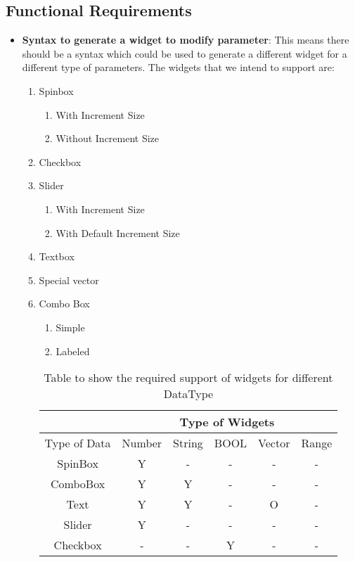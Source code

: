 \subsection{Functional Requirements}
\begin{itemize}
    \item {\bf Syntax to generate a widget to modify parameter}: This means there should be a syntax which could be used to generate a different widget for a different type of parameters.
    The widgets that we intend to support are:
    \begin{enumerate}
        \item Spinbox
            \begin{enumerate}
                \item With Increment Size
                \item Without Increment Size
            \end{enumerate}
        \item Checkbox
        \item Slider
            \begin{enumerate}
                \item With Increment Size
                \item With Default Increment Size
            \end{enumerate}
        \item Textbox
        \item Special vector
        \item Combo Box
            \begin{enumerate}
                \item Simple
                \item Labeled
            \end{enumerate}
   
    \begin{table}[h]
        \centering
        \caption{Table to show the required support of widgets for different DataType}
        \begin{tabular}{ |c|c|c|c|c|c| }
            \hline
            & \multicolumn{5}{|c|}{Type of Widgets} \\
            \hline
            Type of Data&    Number&    String&    BOOL &Vector &Range     \\ [0.5ex]
            \hline
            SpinBox&Y&    -&    -&    -&    - \\ \hline
            ComboBox&    Y&    Y&    -&    -&    - \\ \hline
            Text&    Y&    Y&    -&    O&    - \\ \hline
            Slider&    Y&    -&    -&    -&    - \\ \hline
            Checkbox&    -&    -&    Y&    -&    - \\ [1ex]
            \hline
        \end{tabular}
        \label{table2}
    \end{table}
   

\end{enumerate}
\end{itemize}
